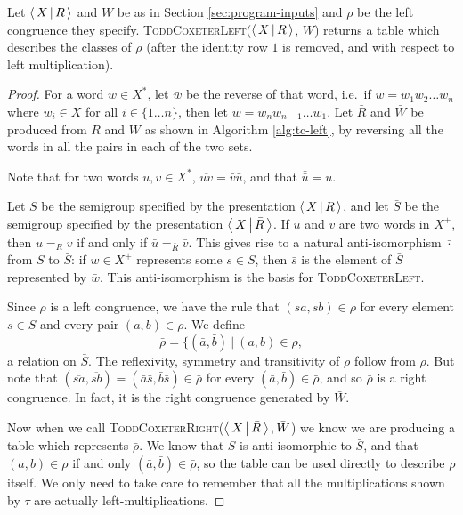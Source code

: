 \begin{theorem}
  Let $\left\langle\,X\,\middle|\,R\,\right\rangle$ and $W$ be as in Section \ref{sec:program-inputs} and $\rho$
  be the left congruence they specify.
  \textsc{ToddCoxeterLeft}($\left\langle\,X\,\middle|\,R\,\right\rangle$, $W$) returns a table which describes the
  classes of $\rho$ (after the identity row $1$ is removed, and with respect to
  left multiplication).
  \begin{proof}
    For a word $w \in X^*$, let $\bar w$ be the reverse of that word, i.e.~if
    $w = w_1 w_2 \ldots w_n$ where $w_i \in X$ for all $i \in \{1 \ldots n\}$,
    then let $\bar w = w_n w_{n-1} \ldots w_1$.  Let $\bar R$ and $\bar W$ be
    produced from $R$ and $W$ as shown in Algorithm \ref{alg:tc-left}, by
    reversing all the words in all the pairs in each of the two sets.

    Note that for two words $u, v \in X^*$, $\overline{uv} = \bar v \bar u$, and
    that $\bar{\bar u} = u$.

    Let $S$ be the semigroup specified by the presentation $\left\langle\,X\,\middle|\,R\,\right\rangle$, and let
    $\bar S$ be the semigroup specified by the presentation $\left\langle\,X\,\middle|\,\bar R\,\right\rangle$.
    If $u$ and $v$ are two words in $X^+$, then $u =_R v$ if and only if
    $\bar u =_{\bar R} \bar v$.  This gives rise to a natural anti-isomorphism
    $\bar \cdot$ from $S$ to $\bar S$: if $w \in X^+$ represents some $s \in S$,
    then $\bar s$ is the element of $\bar S$ represented by $\bar w$.  This
    anti-isomorphism is the basis for \textsc{ToddCoxeterLeft}.

    Since $\rho$ is a left congruence, we have the rule that $(sa, sb) \in \rho$
    for every element $s \in S$ and every pair $(a,b) \in \rho$.  We define
    $$\bar\rho = \{(\bar a, \bar b) ~|~ (a,b) \in \rho,$$
    a relation on $\bar S$.  The reflexivity, symmetry and transitivity of
    $\bar\rho$ follow from $\rho$.  But note that
    $(\overline{sa}, \overline{sb}) = (\bar a \bar s, \bar b \bar s) \in
    \bar\rho$
    for every $(\bar a, \bar b) \in \bar\rho$, and so $\bar\rho$ is a right
    congruence.  In fact, it is the right congruence generated by $\bar W$.

    Now when we call \textsc{ToddCoxeterRight}($\left\langle\,X\,\middle|\,\bar R\,\right\rangle, \bar W$) we
    know we are producing a table which represents $\bar\rho$.  We know that $S$
    is anti-isomorphic to $\bar S$, and that $(a,b) \in \rho$ if and only
    $(\bar a, \bar b) \in \bar\rho$, so the table can be used directly to
    describe $\rho$ itself.  We only need to take care to remember that all the
    multiplications shown by $\tau$ are actually left-multiplications.
  \end{proof}
\end{theorem}


